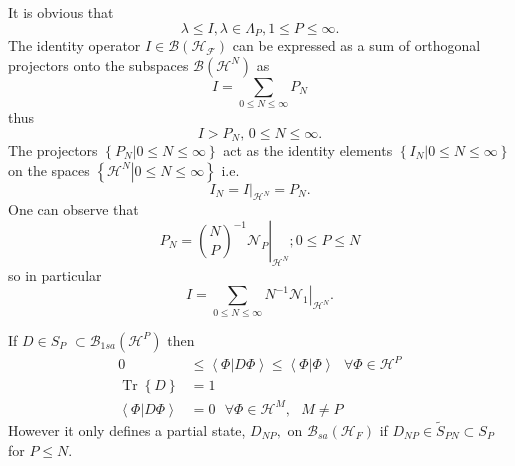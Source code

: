 \documentclass[aps,preprint]{revtex4}%
\begin{document}
It is obvious that
\begin{equation}
\lambda\leq I,\lambda\in\Lambda_{P},1\leq P\leq\infty.
\end{equation}
The identity operator $I\in\mathcal{B}\left(  \mathcal{H}_{\mathcal{F}%
}\right)  $ can be expressed as a sum of orthogonal projectors onto the
subspaces $\mathcal{B}\left(  \mathcal{H}^{N}\right)  $ as%
\begin{equation}
I=\sum_{0\leq N\leq\infty}P_{N}%
\end{equation}
thus
\begin{equation}
I>P_{N},\,0\leq N\leq\infty.
\end{equation}
The projectors $\left\{  \left.  P_{N}\right\vert 0\leq N\leq\infty\right\}  $
act as the identity elements $\left\{  \left.  I_{N}\right\vert 0\leq
N\leq\infty\right\}  $ on the spaces $\left\{  \left.  \mathcal{H}%
^{N}\right\vert 0\leq N\leq\infty\right\}  $ i.e.%
\begin{equation}
I_{N}=\left.  I\right\vert _{\mathcal{H}^{N}}=P_{N}.
\end{equation}
One can observe that
\begin{equation}
P_{N}=\left.  \binom{N}{P}^{-1}\mathcal{N}_{P}\right\vert _{\mathcal{H}^{N}%
};0\leq P\leq N
\end{equation}
so in particular
\begin{equation}
I=\sum_{0\leq N\leq\infty}\left.  N^{-1}\mathcal{N}_{1}\right\vert
_{\mathcal{H}^{N}}.
\end{equation}


If $D\in S_{P}$ $\subset\mathcal{B}_{1sa}\left(  \mathcal{H}^{P}\right)  $
then
\begin{align}
0  &  \leq\left\langle \left.  \Phi\right\vert D\Phi\right\rangle
\leq\left\langle \left.  \Phi\right\vert \Phi\right\rangle \text{ }\forall
\Phi\in\mathcal{H}^{P}\\
\operatorname{Tr}\left\{  D\right\}   &  =1\\
\left\langle \left.  \Phi\right\vert D\Phi\right\rangle  &  =0\text{ }%
\forall\Phi\in\mathcal{H}^{M},\text{ }M\neq P
\end{align}
However it only defines a partial state, $D_{NP},$ on $\mathcal{B}_{sa}\left(
\mathcal{H}_{F}\right)  $ if $D_{NP}\in\tilde{S}_{PN}\subset S_{P}$ for $P\leq
N.$
\end{document}
